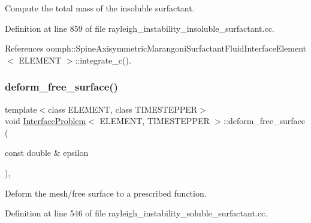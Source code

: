 Compute the total mass of the insoluble surfactant. 



Definition at line 859 of file rayleigh\+\_\+instability\+\_\+insoluble\+\_\+surfactant.\+cc.



References oomph\+::\+Spine\+Axisymmetric\+Marangoni\+Surfactant\+Fluid\+Interface\+Element$<$ E\+L\+E\+M\+E\+N\+T $>$\+::integrate\+\_\+c().

\mbox{\label{classInterfaceProblem_a4514af9aa19dd50d10ca18f12039428f}} 
\subsubsection{\texorpdfstring{deform\+\_\+free\+\_\+surface()}{deform\_free\_surface()}\hspace{0.1cm}{\footnotesize\ttfamily [1/2]}}
{\footnotesize\ttfamily template$<$class E\+L\+E\+M\+E\+NT, class T\+I\+M\+E\+S\+T\+E\+P\+P\+ER$>$ \\
void \hyperlink{classInterfaceProblem}{Interface\+Problem}$<$ E\+L\+E\+M\+E\+NT, T\+I\+M\+E\+S\+T\+E\+P\+P\+ER $>$\+::deform\+\_\+free\+\_\+surface (\begin{DoxyParamCaption}\item[{const double \&}]{epsilon }\end{DoxyParamCaption})\hspace{0.3cm}{\ttfamily [inline]}, {\ttfamily [private]}}



Deform the mesh/free surface to a prescribed function. 



Definition at line 546 of file rayleigh\+\_\+instability\+\_\+soluble\+\_\+surfactant.\+cc.



